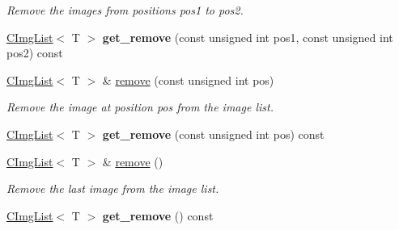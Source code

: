 \begin{DoxyCompactItemize}
\begin{DoxyCompactList}\small\item\em Remove the images from positions {\ttfamily pos1} to {\ttfamily pos2}. \item\end{DoxyCompactList}\item 
\hypertarget{structcimg__library_1_1CImgList_a28a162856972959e34bc5ae6b8235cf6}{
\hyperlink{structcimg__library_1_1CImgList}{CImgList}$<$ T $>$ {\bfseries get\_\-remove} (const unsigned int pos1, const unsigned int pos2) const }
\label{structcimg__library_1_1CImgList_a28a162856972959e34bc5ae6b8235cf6}

\item 
\hypertarget{structcimg__library_1_1CImgList_a53d3b09e0716599143e06294e17527e5}{
\hyperlink{structcimg__library_1_1CImgList}{CImgList}$<$ T $>$ \& \hyperlink{structcimg__library_1_1CImgList_a53d3b09e0716599143e06294e17527e5}{remove} (const unsigned int pos)}
\label{structcimg__library_1_1CImgList_a53d3b09e0716599143e06294e17527e5}

\begin{DoxyCompactList}\small\item\em Remove the image at position {\ttfamily pos} from the image list. \item\end{DoxyCompactList}\item 
\hypertarget{structcimg__library_1_1CImgList_ac3f8d5e03881925788480229770f6318}{
\hyperlink{structcimg__library_1_1CImgList}{CImgList}$<$ T $>$ {\bfseries get\_\-remove} (const unsigned int pos) const }
\label{structcimg__library_1_1CImgList_ac3f8d5e03881925788480229770f6318}

\item 
\hypertarget{structcimg__library_1_1CImgList_aacab3180a7750eaf910e7ec02af2b2af}{
\hyperlink{structcimg__library_1_1CImgList}{CImgList}$<$ T $>$ \& \hyperlink{structcimg__library_1_1CImgList_aacab3180a7750eaf910e7ec02af2b2af}{remove} ()}
\label{structcimg__library_1_1CImgList_aacab3180a7750eaf910e7ec02af2b2af}

\begin{DoxyCompactList}\small\item\em Remove the last image from the image list. \item\end{DoxyCompactList}\item 
\hypertarget{structcimg__library_1_1CImgList_af2317edcac6820a17bd99a577adbb949}{
\hyperlink{structcimg__library_1_1CImgList}{CImgList}$<$ T $>$ {\bfseries get\_\-remove} () const }
\label{structcimg__library_1_1CImgList_af2317edcac6820a17bd99a577adbb949}


\end{DoxyCompactItemize}
